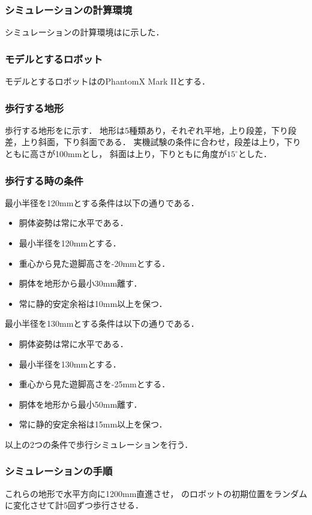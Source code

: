 \subsubsection{シミュレーションの計算環境}
シミュレーションの計算環境はに示した．

\subsubsection{モデルとするロボット}
モデルとするロボットはのPhantomX Mark I\hspace{-1.2pt}Iとする．

\subsubsection{歩行する地形}
歩行する地形をに示す．
地形は5種類あり，それぞれ平地，上り段差，下り段差，上り斜面，下り斜面である．
実機試験の条件に合わせ，段差は上り，下りともに高さが100mmとし，
斜面は上り，下りともに角度が$15^{\circ}$とした．

\subsubsection{歩行する時の条件}
最小半径を120mmとする条件は以下の通りである．
\begin{itemize}
  \item 胴体姿勢は常に水平である．
  \item 最小半径を120mmとする．
  \item 重心から見た遊脚高さを-20mmとする．
  \item 胴体を地形から最小30mm離す．
  \item 常に静的安定余裕は10mm以上を保つ．
\end{itemize}

最小半径を130mmとする条件は以下の通りである．
\begin{itemize}
  \item 胴体姿勢は常に水平である．
  \item 最小半径を130mmとする．
  \item 重心から見た遊脚高さを-25mmとする．
  \item 胴体を地形から最小50mm離す．
  \item 常に静的安定余裕は15mm以上を保つ．
\end{itemize}

以上の2つの条件で歩行シミュレーションを行う．

\subsubsection{シミュレーションの手順}
これらの地形で水平方向に1200mm直進させ，
のロボットの初期位置をランダムに変化させて計5回ずつ歩行させる．

